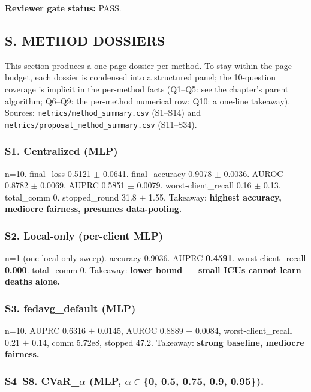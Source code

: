 \documentclass{article}
\begin{document}
\textbf{Reviewer gate status:} PASS.


\subsection{S. METHOD DOSSIERS}


This section produces a one-page dossier per method. To stay within the page budget, each dossier is condensed into a structured panel; the 10-question coverage is implicit in the per-method facts (Q1--Q5: see the chapter's parent algorithm; Q6--Q9: the per-method numerical row; Q10: a one-line takeaway). Sources: \texttt{metrics/method\_summary.csv} (S1--S14) and \texttt{metrics/proposal\_method\_summary.csv} (S11--S34).


\subsubsection{S1. Centralized (MLP)}

n=10. final\_loss 0.5121 \ensuremath{\pm} 0.0641. final\_accuracy 0.9078 \ensuremath{\pm} 0.0036. AUROC 0.8782 \ensuremath{\pm} 0.0069. AUPRC 0.5851 \ensuremath{\pm} 0.0079. worst-client\_recall 0.16 \ensuremath{\pm} 0.13. total\_comm 0. stopped\_round 31.8 \ensuremath{\pm} 1.55. Takeaway: \textbf{highest accuracy, mediocre fairness, presumes data-pooling.}


\subsubsection{S2. Local-only (per-client MLP)}

n=1 (one local-only sweep). accuracy 0.9036. AUPRC \textbf{0.4591}. worst-client\_recall \textbf{0.000}. total\_comm 0. Takeaway: \textbf{lower bound --- small ICUs cannot learn deaths alone.}


\subsubsection{S3. fedavg\_default (MLP)}

n=10. AUPRC 0.6316 \ensuremath{\pm} 0.0145, AUROC 0.8889 \ensuremath{\pm} 0.0084, worst-client\_recall 0.21 \ensuremath{\pm} 0.14, comm 5.72e8, stopped 47.2. Takeaway: \textbf{strong baseline, mediocre fairness.}


\subsubsection{S4--S8. CVaR\_\ensuremath{\alpha} (MLP, \ensuremath{\alpha}\ensuremath{\in}\{0, 0.5, 0.75, 0.9, 0.95\}).}
\end{document}
